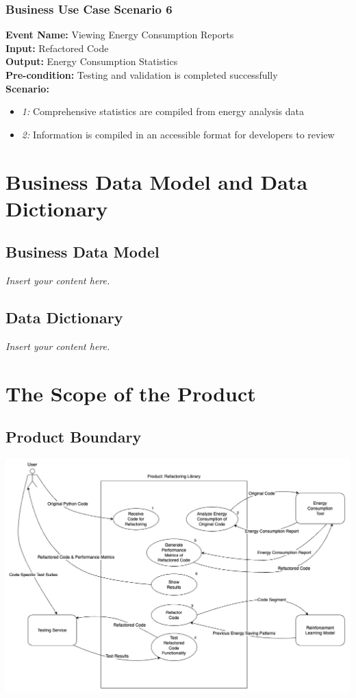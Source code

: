 \documentclass[12pt]{article}
\newcommand{\lips}{\textit{Insert your content here.}}
\begin{document}
\subsubsection{Business Use Case Scenario 6} 
\textbf{Event Name:} Viewing Energy Consumption Reports \\
\textbf{Input:} Refactored Code \\
\textbf{Output:} Energy Consumption Statistics \\
\textbf{Pre-condition:} Testing and validation is completed successfully \\
\textbf{Scenario: } \\
\begin{itemize}
    \item \textit{1:} Comprehensive statistics are compiled from energy analysis data
    \item \textit{2:} Information is compiled in an accessible format for developers to review
\end{itemize}


\section{Business Data Model and Data Dictionary}
\subsection{Business Data Model}
\lips
\subsection{Data Dictionary}
\lips

\section{The Scope of the Product}
\subsection{Product Boundary}
\includegraphics[scale=0.4]{../Images/UseCaseDiagram.png}
\end{document}
